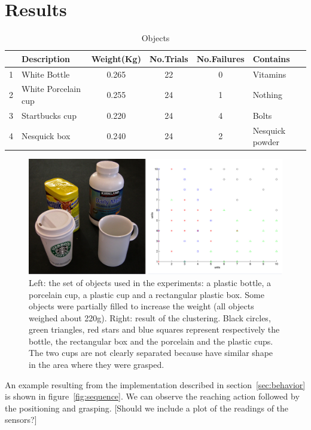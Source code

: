 \section{Results}
\label{sec:results}

\begin{table}[tb]
  \caption{Objects} \label{tab:objects} \centering
  \begin{tabular}{|c|l|c|c|c|l|}
    \hline
    &Description& Weight(Kg)&No.Trials&No.Failures&Contains \\
    \hline
    1&White Bottle        & 0.265 & 22& 0 & Vitamins\\
    2&White Porcelain cup & 0.255 & 24& 1 & Nothing\\
    3&Startbucks cup      & 0.220 & 24& 4 & Bolts \\
    4&Nesquick box        & 0.240 & 24& 2 & Nesquick powder\\

    \hline
  \end{tabular}
\end{table}

\begin{figure}[tb]
\centerline{
\includegraphics[width=6.0in]{./figures/objects-clusters.eps}
}\caption{Left: the set of objects used in the experiments: a plastic bottle, 
a porcelain cup, a plastic cup and a rectangular plastic box. Some objects were 
partially filled to increase the weight (all objects weighed about 220g). 
Right: result of the clustering. Black circles, green 
triangles, red stars and blue squares represent respectively the bottle, 
the rectangular box and the porcelain and the plastic cups. The two cups are not 
clearly separated because have similar shape in the area where they were grasped.}
\label{fig:Objects}
\end{figure}

An example resulting from the implementation described in
section~\ref{sec:behavior} is shown in figure~\ref{fig:sequence}.
We can observe the reaching action followed by the positioning and
grasping. [Should we include a plot of the readings of the
sensors?]

